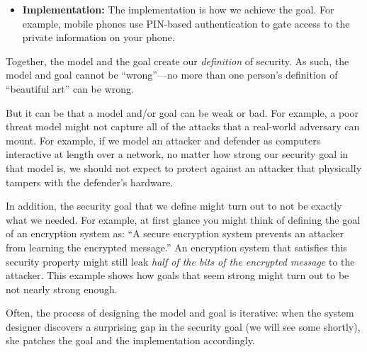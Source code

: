 \documentclass[
  letterpaper,
]{scrbook}
\theoremstyle{definition}
\theoremstyle{plain}
\theoremstyle{plain}
\theoremstyle{remark}
\begin{document}
\begin{itemize}
  For example, in network security, we might want the property that
  ``only someone knowing Alice's secret password can execute shell
  commands on the machine.'' In hardware security, we might want the
  property that ``the attacker learns nothing about the data stored in
  RAM, apart from its size.'' In ATM security, we might want the
  property that ``an attacker can fraudulently authenticate as a victim
  with probability at most \(1/10000\).''

  As you will learn throughout the course, figuring out exactly what
  your security goal should be is often quite subtle and challenging.
\item
  \textbf{Implementation:} The implementation is how we achieve the
  goal. For example, mobile phones use PIN-based authentication to gate
  access to the private information on your phone.
\end{itemize}

Together, the model and the goal create our \emph{definition} of
security. As such, the model and goal cannot be ``wrong''---no more than
one person's definition of ``beautiful art'' can be wrong.

But it can be that a model and/or goal can be weak or bad. For example,
a poor threat model might not capture all of the attacks that a
real-world adversary can mount. For example, if we model an attacker and
defender as computers interactive at length over a network, no matter
how strong our security goal in that model is, we should not expect to
protect against an attacker that physically tampers with the defender's
hardware.

In addition, the security goal that we define might turn out to not be
exactly what we needed. For example, at first glance you might think of
defining the goal of an encryption system as: ``A secure encryption
system prevents an attacker from learning the encrypted message.'' An
encryption system that satisfies this security property might still leak
\emph{half of the bits of the encrypted message} to the attacker. This
example shows how goals that seem strong might turn out to be not nearly
strong enough.

Often, the process of designing the model and goal is iterative: when
the system designer discovers a surprising gap in the security goal (we
will see some shortly), she patches the goal and the implementation
accordingly.

\end{document}
